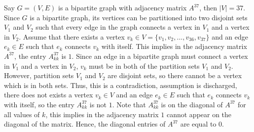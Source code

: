 \documentclass[11pt]{article}
\begin{document}
Say $G = (V, E)$ is a bipartite graph with adjacency matrix $A^{37}$, then $|V| = 37$. Since $G$ is a bipartite graph, its vertices can be partitioned into two disjoint sets $V_1$ and $V_2$ such that every edge in the graph connects a vertex in $V_1$ and a vertex in $V_2$. Assume that there exists a vertex $v_k \in V = \{v_1,v_2,...,v_{36},v_{37}\}$ and an edge $e_k \in E$ such that $e_k$ connects $v_k$ with itself. This implies in the adjacency matrix $A^{37}$, the entry $A^{37}_{kk}$ is $1$. Since an edge in a bipartite graph must connect a vertex in $V_1$ and a vertex in $V_2$, $v_k$ must be in both of the partition sets $V_1$ and $V_2$. However, partition sets $V_1$ and $V_2$ are disjoint sets, so there cannot be a vertex which is in both sets. Thus, this is a contradiction, assumption is discharged, there does not exists a vertex $v_k \in V$ and an edge $e_k \in E$ such that $e_k$ connects $v_k$ with itself, so the entry $A^{37}_{kk}$ is not $1$. Note that $A^{37}_{kk}$ is on the diagonal of $A^{37}$ for all values of $k$, this implies in the adjacency matrix $1$ cannot appear on the diagonal of the matrix. Hence, the diagonal entries of $A^{37}$ are equal to $0$.
\end{document}
